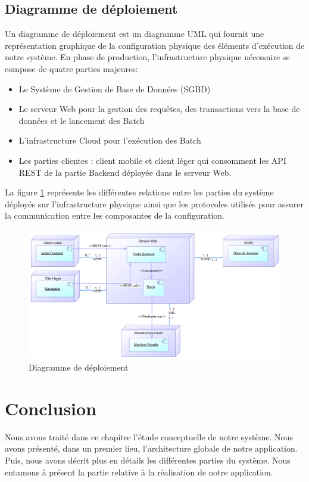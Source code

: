 \subsection{Diagramme de déploiement} \label{para}

\qquad Un diagramme de déploiement est un diagramme UML qui fournit une représentation graphique de la configuration physique des éléments d'exécution de notre système. En phase de production, l'infrastructure physique nécessaire se compose de quatre parties majeures: 

\begin{itemize}
	\item Le Système de Gestion de Base de Données (SGBD)
	\item Le serveur Web pour la gestion des requêtes, des transactions vers la base de données et le lancement des Batch
	\item L'infrastructure Cloud pour l'exécution des Batch
	\item Les parties clientes : client mobile et client léger qui consomment les API REST de la partie Backend déployée dans le serveur Web.\\
\end{itemize}

La figure \ref{fig3.11} représente les différentes relations entre les parties du système déployés sur l'infrastructure physique ainsi que les protocoles utilisés pour assurer la communication entre les composantes de la configuration.

\begin{figure}[!h]
	\begin{center}
		\includegraphics[width=0.63\textheight]{figures/dep}
	\end{center}
	\caption{Diagramme de déploiement}
	\label{fig3.11}
\end{figure}

\section*{Conclusion}

\qquad Nous avons traité dans ce chapitre l’étude conceptuelle de notre système. Nous avons présenté, dans un premier lieu, l’architecture globale de notre application. Puis, nous avons décrit plus en détails les différentes parties du système. Nous entamons à présent la partie relative à la réalisation de notre application.